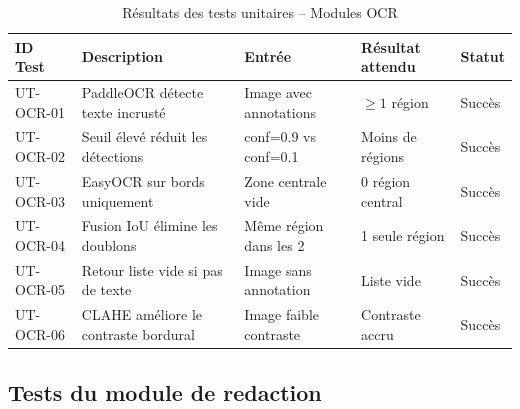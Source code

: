 \begin{table}[H]
\centering
\caption{Résultats des tests unitaires -- Modules OCR}
\label{tab:tests_ocr}
\begin{tabularx}{\textwidth}{p{2.2cm} X p{3cm} p{1.5cm} p{1.2cm}}
\toprule
\textbf{ID Test} & \textbf{Description} & \textbf{Entrée} & \textbf{Résultat attendu} & \textbf{Statut} \\
\midrule
UT-OCR-01 & PaddleOCR détecte texte incrusté        & Image avec annotations & $\geq 1$ région & \textcolor{green!60!black}{Succès} \\
UT-OCR-02 & Seuil élevé réduit les détections      & conf=0.9 vs conf=0.1 & Moins de régions & \textcolor{green!60!black}{Succès} \\
UT-OCR-03 & EasyOCR sur bords uniquement            & Zone centrale vide    & 0 région central  & \textcolor{green!60!black}{Succès} \\
UT-OCR-04 & Fusion IoU élimine les doublons         & Même région dans les 2 & 1 seule région & \textcolor{green!60!black}{Succès} \\
UT-OCR-05 & Retour liste vide si pas de texte       & Image sans annotation & Liste vide  & \textcolor{green!60!black}{Succès} \\
UT-OCR-06 & CLAHE améliore le contraste bordural    & Image faible contraste & Contraste accru & \textcolor{green!60!black}{Succès} \\
\bottomrule
\end{tabularx}
\end{table}

\subsection{Tests du module de redaction}

